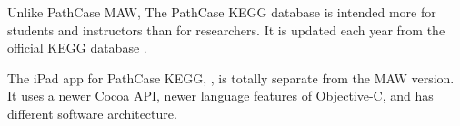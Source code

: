 Unlike PathCase MAW, The PathCase KEGG database is intended more for students
and instructors than for researchers. It is updated each year from the official
KEGG database \cite{pathcase-basic}.

The iPad app for PathCase KEGG, \keggapp, is totally separate from the MAW
version. It uses a newer Cocoa API, newer language features of Objective-C, and
has different software architecture.








